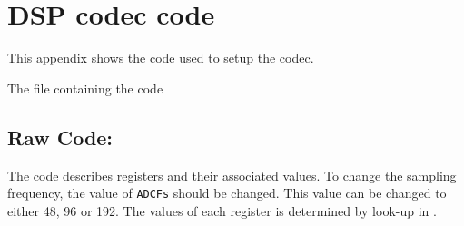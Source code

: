 \section{DSP codec code}\label{sec:codecsetup}

This appendix shows the code used to setup the codec.

The file containing the code  

\subsection{Raw Code:}

The code describes registers and their associated values. To change the sampling frequency, the value of \verb|ADCFs| should be changed. This value can be changed to either 48, 96 or 192. The values of each register is determined by look-up in .


